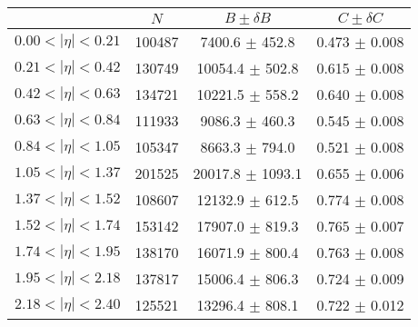 \begin{tabular}{lccc}
\hline
    &   $N$   & $B \pm \delta B$  &  $C \pm \delta C$ \\
\hline
$0.00 < |\eta| <0.21$          & 100487     & 7400.6     $\pm$ 452.8 & 0.473      $\pm$ 0.008 \\
$0.21 < |\eta| <0.42$          & 130749     & 10054.4    $\pm$ 502.8 & 0.615      $\pm$ 0.008 \\
$0.42 < |\eta| <0.63$          & 134721     & 10221.5    $\pm$ 558.2 & 0.640      $\pm$ 0.008 \\
$0.63 < |\eta| <0.84$          & 111933     & 9086.3     $\pm$ 460.3 & 0.545      $\pm$ 0.008 \\
$0.84 < |\eta| <1.05$          & 105347     & 8663.3     $\pm$ 794.0 & 0.521      $\pm$ 0.008 \\
$1.05 < |\eta| <1.37$          & 201525     & 20017.8    $\pm$ 1093.1 & 0.655      $\pm$ 0.006 \\
$1.37 < |\eta| <1.52$          & 108607     & 12132.9    $\pm$ 612.5 & 0.774      $\pm$ 0.008 \\
$1.52 < |\eta| <1.74$          & 153142     & 17907.0    $\pm$ 819.3 & 0.765      $\pm$ 0.007 \\
$1.74 < |\eta| <1.95$          & 138170     & 16071.9    $\pm$ 800.4 & 0.763      $\pm$ 0.008 \\
$1.95 < |\eta| <2.18$          & 137817     & 15006.4    $\pm$ 806.3 & 0.724      $\pm$ 0.009 \\
$2.18 < |\eta| <2.40$          & 125521     & 13296.4    $\pm$ 808.1 & 0.722      $\pm$ 0.012 \\
\hline
\end{tabular}
